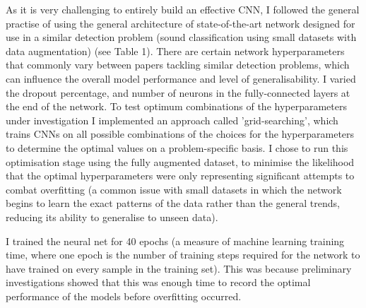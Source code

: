 \documentclass[11pt]{article}
\begin{document}
As it is very challenging to entirely build an effective CNN, I followed the general practise of using the general architecture of state-of-the-art network designed for use in a similar detection problem (sound classification using small datasets with data augmentation) \citep{salamon2017deep} (see Table 1). There are certain network hyperparameters that commonly vary between papers tackling similar detection problems, which can influence the overall model performance and level of generalisability. I varied the dropout percentage, and number of neurons in the fully-connected layers at the end of the network. To test optimum combinations of the hyperparameters under investigation I implemented an approach called 'grid-searching', which trains CNNs on all possible combinations of the choices for the hyperparameters to determine the optimal values on a problem-specific basis. I chose to run this optimisation stage using the fully augmented dataset, to minimise the likelihood that the optimal hyperparameters were only representing significant attempts to combat overfitting (a common issue with small datasets in which the network begins to learn the exact patterns of the data rather than the general trends, reducing its ability to generalise to unseen data). 

I trained the neural net for 40 epochs (a measure of machine learning training time, where one epoch is the number of training steps required for the network to have trained on every sample in the training set). This was because preliminary investigations showed that this was enough time to record the optimal performance of the models before overfitting occurred.   
\end{document}
